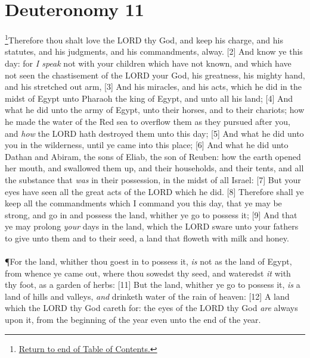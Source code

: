\chapter{Deuteronomy 11}
\footnote{\textcolor[rgb]{0.00,0.25,0.00}{\hyperlink{DeuteronomyTOC}{Return to end of Table of Contents.}}}\textcolor[rgb]{0.00,0.00,1.00}{Therefore thou shalt love the LORD thy God, and keep his charge, and his statutes, and his judgments, and his commandments, alway.}
[2] \textcolor[rgb]{0.00,0.00,1.00}{And know ye this day: for \emph{I speak} not with your children which have not known, and which have not seen the chastisement of the LORD your God, his greatness, his mighty hand, and his stretched out arm,}
[3] \textcolor[rgb]{0.00,0.00,1.00}{And his miracles, and his acts, which he did in the midst of Egypt unto Pharaoh the king of Egypt, and unto all his land;}
[4] \textcolor[rgb]{0.00,0.00,1.00}{And what he did unto the army of Egypt, unto their horses, and to their chariots; how he made the water of the Red sea to overflow them as they pursued after you, and \emph{how} the LORD hath destroyed them unto this day;}
[5] \textcolor[rgb]{0.00,0.00,1.00}{And what he did unto you in the wilderness, until ye came into this place;}
[6] \textcolor[rgb]{0.00,0.00,1.00}{And what he did unto Dathan and Abiram, the sons of Eliab, the son of Reuben: how the earth opened her mouth, and swallowed them up, and their households, and their tents, and all the substance that \emph{was} in their possession, in the midst of all Israel:}
[7] \textcolor[rgb]{0.00,0.00,1.00}{But your eyes have seen all the great acts of the LORD which he did.}
[8] \textcolor[rgb]{0.00,0.00,1.00}{Therefore shall ye keep all the commandments which I command you this day, that ye may be strong, and go in and possess the land, whither ye go to possess it;}
[9] \textcolor[rgb]{0.00,0.00,1.00}{And that ye may prolong \emph{your} days in the land, which the LORD sware unto your fathers to give unto them and to their seed, a land that floweth with milk and honey.}\\
\\
\P \textcolor[rgb]{0.00,0.00,1.00}{For the land, whither thou goest in to possess it, \emph{is} not as the land of Egypt, from whence ye came out, where thou sowedst thy seed, and wateredst \emph{it} with thy foot, as a garden of herbs:}
[11] \textcolor[rgb]{0.00,0.00,1.00}{But the land, whither ye go to possess it, \emph{is} a land of hills and valleys, \emph{and} drinketh water of the rain of heaven:}
[12] \textcolor[rgb]{0.00,0.00,1.00}{A land which the LORD thy God careth for: the eyes of the LORD thy God \emph{are} always upon it, from the beginning of the year even unto the end of the year.}\\
